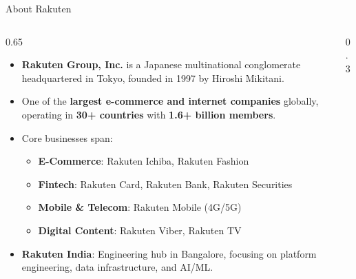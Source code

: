 \documentclass{beamer}
\begin{document}
\begin{frame}[shrink=10]{About Rakuten}
  \begin{columns}[T]
    \begin{column}{0.65\textwidth}
      \begin{itemize}
        \item \textbf{Rakuten Group, Inc.} is a Japanese multinational conglomerate headquartered in Tokyo, founded in 1997 by Hiroshi Mikitani.
        \item One of the \textbf{largest e-commerce and internet companies} globally, operating in \textbf{30+ countries} with \textbf{1.6+ billion members}.
        \item Core businesses span:
        \begin{itemize}
            \item[\textcolor{VividOrange}{\faShoppingCart}] \textbf{E-Commerce}: Rakuten Ichiba, Rakuten Fashion
            \item[\textcolor{TealGreen}{\faCreditCard}] \textbf{Fintech}: Rakuten Card, Rakuten Bank, Rakuten Securities
            \item[\textcolor{SoftPurple}{\faSignal}] \textbf{Mobile \& Telecom}: Rakuten Mobile (4G/5G)
            \item[\textcolor{DeepBlue}{\faCloud}] \textbf{Digital Content}: Rakuten Viber, Rakuten TV
        \end{itemize}
        \item \textbf{Rakuten India}: Engineering hub in Bangalore, focusing on platform engineering, data infrastructure, and AI/ML.
      \end{itemize}
    \end{column}
    \begin{column}{0.3\textwidth}
      \centering
    \end{column}
  \end{columns}
\end{frame}
\end{document}
